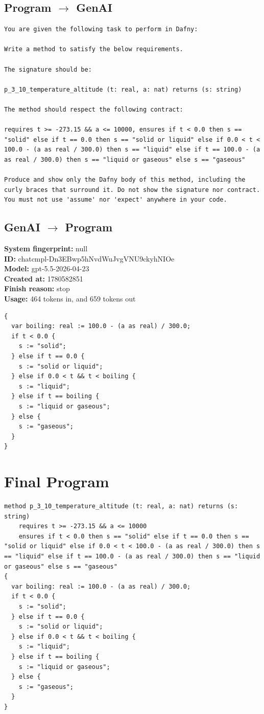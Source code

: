 \documentclass{article}
\begin{document}
\subsection*{Program $\rightarrow$ GenAI}
\begin{lstlisting}
You are given the following task to perform in Dafny:

Write a method to satisfy the below requirements.

The signature should be:

p_3_10_temperature_altitude (t: real, a: nat) returns (s: string)

The method should respect the following contract:

requires t >= -273.15 && a <= 10000, ensures if t < 0.0 then s == "solid" else if t == 0.0 then s == "solid or liquid" else if 0.0 < t < 100.0 - (a as real / 300.0) then s == "liquid" else if t == 100.0 - (a as real / 300.0) then s == "liquid or gaseous" else s == "gaseous"

Produce and show only the Dafny body of this method, including the curly braces that surround it. Do not show the signature nor contract. You must not use 'assume' nor 'expect' anywhere in your code.
\end{lstlisting}
\subsection*{GenAI $\rightarrow$ Program}
\textbf{System fingerprint: }null
\\\textbf{ID: }chatcmpl-Dn3EBwp5hNvdWuJvgVNU9ckyhNIOe
\\\textbf{Model: }gpt-5.5-2026-04-23
\\\textbf{Created at: }1780582851
\\\textbf{Finish reason: }stop
\\\textbf{Usage: }464 tokens in, and 659 tokens out
\begin{lstlisting}
{
  var boiling: real := 100.0 - (a as real) / 300.0;
  if t < 0.0 {
    s := "solid";
  } else if t == 0.0 {
    s := "solid or liquid";
  } else if 0.0 < t && t < boiling {
    s := "liquid";
  } else if t == boiling {
    s := "liquid or gaseous";
  } else {
    s := "gaseous";
  }
}
\end{lstlisting}
\section*{Final Program}
\begin{lstlisting}
method p_3_10_temperature_altitude (t: real, a: nat) returns (s: string)
	requires t >= -273.15 && a <= 10000
	ensures if t < 0.0 then s == "solid" else if t == 0.0 then s == "solid or liquid" else if 0.0 < t < 100.0 - (a as real / 300.0) then s == "liquid" else if t == 100.0 - (a as real / 300.0) then s == "liquid or gaseous" else s == "gaseous"
{
  var boiling: real := 100.0 - (a as real) / 300.0;
  if t < 0.0 {
    s := "solid";
  } else if t == 0.0 {
    s := "solid or liquid";
  } else if 0.0 < t && t < boiling {
    s := "liquid";
  } else if t == boiling {
    s := "liquid or gaseous";
  } else {
    s := "gaseous";
  }
}
\end{lstlisting}
\end{document}
